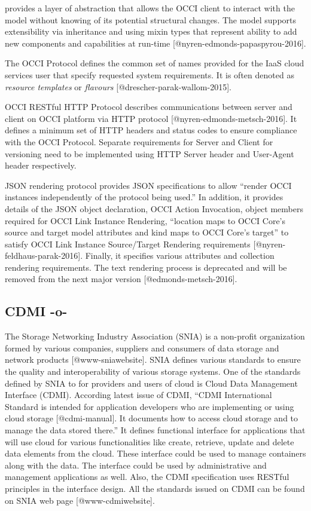 provides a layer of abstraction that allows the OCCI client to
interact with the model without knowing of its potential structural
changes. The model supports extensibility via inheritance and using
mixin types that represent ability to add new components and
capabilities at run-time [@nyren-edmonds-papaspyrou-2016].

The OCCI Protocol defines the common set of names provided for the
IaaS cloud services user that specify requested system
requirements. It is often denoted as \textit{resource templates} or
\textit{flavours} [@drescher-parak-wallom-2015].

OCCI RESTful HTTP Protocol describes communications between server and
client on OCCI platform via HTTP protocol
[@nyren-edmonds-metsch-2016]. It defines a minimum set of HTTP
headers and status codes to ensure compliance with the OCCI
Protocol. Separate requirements for Server and Client for versioning
need to be implemented using HTTP Server header and User-Agent header
respectively.

JSON rendering protocol provides JSON specifications to allow ``render
OCCI instances independently of the protocol being used.'' In
addition, it provides details of the JSON object declaration, OCCI
Action Invocation, object members required for OCCI Link Instance
Rendering, ``location maps to OCCI Core's source and target model
attributes and kind maps to OCCI Core's target'' to satisfy OCCI Link
Instance Source/Target Rendering requirements
[@nyren-feldhaus-parak-2016].  Finally, it specifies various
attributes and collection rendering requirements.  The text rendering
process is deprecated and will be removed from the next major version
[@edmonds-metsch-2016].


   
\subsection{CDMI -o-}

The Storage Networking Industry Association (SNIA) is a non-profit
organization formed by various companies, suppliers and consumers of
data storage and network products [@www-sniawebsite]. SNIA defines
various standards to ensure the quality and interoperability of
various storage systems. One of the standards defined by SNIA to for
providers and users of cloud is Cloud Data Management Interface
(CDMI). According latest issue of CDMI, ``CDMI International Standard
is intended for application developers who are implementing or using
cloud storage [@cdmi-manual]. It documents how to access cloud
storage and to manage the data stored there.'' It defines functional
interface for applications that will use cloud for various
functionalities like create, retrieve, update and delete data elements
from the cloud. These interface could be used to manage containers
along with the data. The interface could be used by administrative and
management applications as well. Also, the CDMI specification uses
RESTful principles in the interface design. All the standards issued
on CDMI can be found on SNIA web page [@www-cdmiwebsite].





